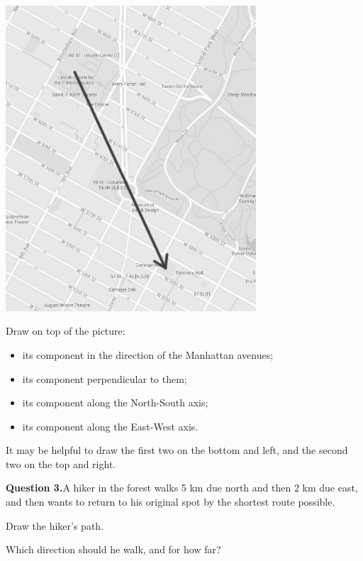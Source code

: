 \documentclass[12pt]{article}
\newcommand{\BI}{\begin{itemize}}
\newcommand{\EI}{\end{itemize}}
\begin{document}
	\begin{center}
		
		
		\includegraphics[width=0.7\textwidth]{manhattan-2.png}
		
		
	\end{center}
	
	Draw on top of the picture:
	
	\BI
	\item its component in the direction of the Manhattan avenues;
	\item its component perpendicular to them;
	\item its component along the North-South axis;
	\item its component along the East-West axis.
	\EI

	
	It may be helpful to draw the first two on the bottom and left, and the second two on the top and right.
	\vspace{1in}
	\vspace{3in}	

\newpage
{\bf Question 3.}A hiker in the forest walks 5 km due north and then 2 km due east, and then wants to return to his original spot by the shortest route possible. 

Draw the hiker's path. 








\vspace{3in}

Which direction should he walk, and for how far?
\end{document}
